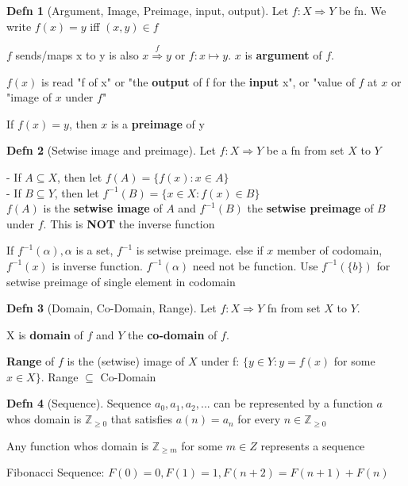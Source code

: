 \documentclass[a4paper]{article}
\theoremstyle{definition}
\newtheorem*{defn}{Defn}
\begin{document}
\begin{defn}[Argument, Image, Preimage, input, output] Let $f:X \Rightarrow Y$ be fn. We write $f(x) = y$ iff $(x, y) \in f$

  $f$ sends/maps x to y is also $x \overset {f}{\Rightarrow} y$ or $f:x \mapsto y$. $x$ is \textbf{argument} of $f$.

  $f(x)$ is read "f of x" or "the \textbf{output} of f for the \textbf{input} x", or "value of $f$ at $x$ or "image of $x$ under $f$"

  If $f(x) = y$, then $x$ is a \textbf{preimage} of y
\end{defn}

\begin{defn}[Setwise image and preimage] Let $f: X \Rightarrow Y$ be a fn from set $X$ to $Y$

  - If $A \subseteq X$, then let $f(A) = \{f(x): x \in A\}$\\
  - If $B \subseteq Y$, then let $f^{-1}(B) = \{x \in X: f(x) \in B\}$\\
  $f(A)$ is the \textbf{setwise image} of $A$ and $f^{-1}(B)$ the \textbf{setwise preimage} of $B$ under $f$. This is \textbf{NOT} the inverse function

  If $f^{-1}(\alpha), \alpha$ is a set, $f^{-1}$ is setwise preimage. else if $x$ member of codomain, $f^{-1}(x)$ is inverse function. $f^{-1}(\alpha)$ need not be function. Use $f^{-1}(\{b\})$ for setwise preimage of single element in codomain
\end{defn}

\begin{defn}[Domain, Co-Domain, Range] Let $f: X \Rightarrow Y$ fn from set $X$ to $Y$.

  X is \textbf{domain} of $f$ and $Y$ the \textbf{co-domain} of $f$.

  \textbf{Range} of $f$ is the (setwise) image of $X$ under f: $\{y \in Y: y = f(x)$ for some $x \in X\}$. Range $\subseteq$ Co-Domain
\end{defn}

\begin{defn}[Sequence] Sequence $a_0,a_1,a_2,...$ can be represented by a function $a$ whos domain is $\mathbb{Z}_{\geq0}$ that satisfies $a(n) = a_n$ for every $n \in \mathbb{Z}_{\geq0}$

  Any function whos domain is $\mathbb{Z}_{\geq m}$ for some $m \in Z$ represents a sequence

  Fibonacci Sequence: $F(0) = 0, F(1) = 1, F(n+2) = F(n+1) + F(n)$
\end{defn}
\end{document}
